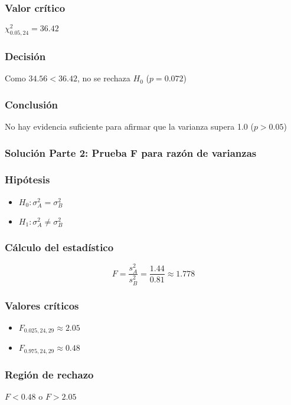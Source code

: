 \subsubsection*{Valor crítico}
$\chi^2_{0.05,24} = 36.42$

\subsubsection*{Decisión}
Como $34.56 < 36.42$, no se rechaza $H_0$ ($p = 0.072$)

\subsubsection*{Conclusión}
No hay evidencia suficiente para afirmar que la varianza supera 1.0 ($p > 0.05$)

\subsubsection*{Solución Parte 2: Prueba F para razón de varianzas}

\subsubsection*{Hipótesis}
\begin{itemize}
\item $H_0: \sigma^2_A = \sigma^2_B$
\item $H_1: \sigma^2_A \neq \sigma^2_B$
\end{itemize}

\subsubsection*{Cálculo del estadístico}
\[
F = \frac{s^2_A}{s^2_B} = \frac{1.44}{0.81} \approx 1.778
\]

\subsubsection*{Valores críticos}
\begin{itemize}
\item $F_{0.025,24,29} \approx 2.05$
\item $F_{0.975,24,29} \approx 0.48$
\end{itemize}

\subsubsection*{Región de rechazo}
$F < 0.48$ o $F > 2.05$

